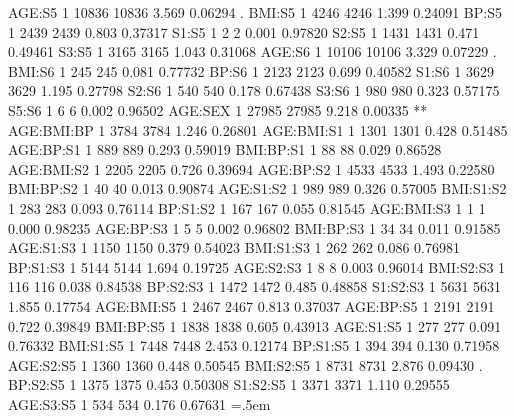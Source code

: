 \documentclass[runningheads]{llncs}
\newenvironment{lcverbatim}
 {\SaveVerbatim{cverb}}
 {\endSaveVerbatim
  \flushleft\fboxrule=0pt\fboxsep=.5em
  \colorbox{cverbbg}{%
    \makebox[\dimexpr\linewidth-2\fboxsep][l]{\BUseVerbatim{cverb}}%
  }
  \endflushleft
}
\begin{document}
\begin{lcverbatim}
AGE:S5                  1  10836   10836   3.569  0.06294 .  
BMI:S5                  1   4246    4246   1.399  0.24091    
BP:S5                   1   2439    2439   0.803  0.37317    
S1:S5                   1      2       2   0.001  0.97820    
S2:S5                   1   1431    1431   0.471  0.49461    
S3:S5                   1   3165    3165   1.043  0.31068    
AGE:S6                  1  10106   10106   3.329  0.07229 .  
BMI:S6                  1    245     245   0.081  0.77732    
BP:S6                   1   2123    2123   0.699  0.40582    
S1:S6                   1   3629    3629   1.195  0.27798    
S2:S6                   1    540     540   0.178  0.67438    
S3:S6                   1    980     980   0.323  0.57175    
S5:S6                   1      6       6   0.002  0.96502    
AGE:SEX                 1  27985   27985   9.218  0.00335 ** 
AGE:BMI:BP              1   3784    3784   1.246  0.26801    
AGE:BMI:S1              1   1301    1301   0.428  0.51485    
AGE:BP:S1               1    889     889   0.293  0.59019    
BMI:BP:S1               1     88      88   0.029  0.86528    
AGE:BMI:S2              1   2205    2205   0.726  0.39694    
AGE:BP:S2               1   4533    4533   1.493  0.22580    
BMI:BP:S2               1     40      40   0.013  0.90874    
AGE:S1:S2               1    989     989   0.326  0.57005    
BMI:S1:S2               1    283     283   0.093  0.76114    
BP:S1:S2                1    167     167   0.055  0.81545    
AGE:BMI:S3              1      1       1   0.000  0.98235    
AGE:BP:S3               1      5       5   0.002  0.96802    
BMI:BP:S3               1     34      34   0.011  0.91585    
AGE:S1:S3               1   1150    1150   0.379  0.54023    
BMI:S1:S3               1    262     262   0.086  0.76981    
BP:S1:S3                1   5144    5144   1.694  0.19725    
AGE:S2:S3               1      8       8   0.003  0.96014    
BMI:S2:S3               1    116     116   0.038  0.84538    
BP:S2:S3                1   1472    1472   0.485  0.48858    
S1:S2:S3                1   5631    5631   1.855  0.17754    
AGE:BMI:S5              1   2467    2467   0.813  0.37037    
AGE:BP:S5               1   2191    2191   0.722  0.39849    
BMI:BP:S5               1   1838    1838   0.605  0.43913    
AGE:S1:S5               1    277     277   0.091  0.76332    
BMI:S1:S5               1   7448    7448   2.453  0.12174    
BP:S1:S5                1    394     394   0.130  0.71958    
AGE:S2:S5               1   1360    1360   0.448  0.50545    
BMI:S2:S5               1   8731    8731   2.876  0.09430 .  
BP:S2:S5                1   1375    1375   0.453  0.50308    
S1:S2:S5                1   3371    3371   1.110  0.29555    
AGE:S3:S5               1    534     534   0.176  0.67631    
\end{lcverbatim}
\end{document}
